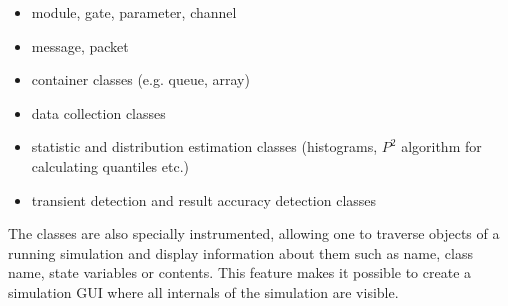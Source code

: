 \begin{itemize}
  \item{module, gate, parameter, channel}
  \item{message, packet}
  \item{container classes (e.g. queue, array)}
  \item{data collection classes}
  \item{statistic and distribution estimation classes (histograms, $P^2$
  algorithm for calculating quantiles etc.)}
  \item{transient detection and result accuracy detection classes}
\end{itemize}

The classes are also specially instrumented, allowing one
to traverse objects of a running simulation and display information
about them such as name, class name, state variables or contents.
This feature makes it possible to create a simulation GUI where
all internals of the simulation are visible.


